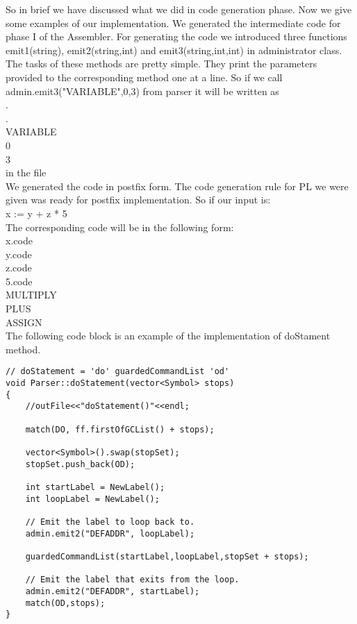 \documentclass[paper=letter, fontsize=12pt]{scrartcl} %
\begin{document}
So in brief we have discussed what we did in code generation phase. Now we give some examples of our implementation. We generated the intermediate code for phase I of the Assembler. For generating the code we introduced three functions emit1(string), emit2(string,int) and emit3(string,int,int) in administrator class. The tasks of these methods are pretty simple. They print the parameters provided to the corresponding method one at a line. So if we call admin.emit3("VARIABLE",0,3) from parser it will be written as\\

.\\
.\\
VARIABLE\\
0\\
3\\
in the file \\

We generated the code in postfix form. The code generation rule for PL we were given was ready for postfix implementation. So if our input is:\\
x := y + z * 5\\
The corresponding code will be in the following form:\\
x.code\\
y.code\\
z.code\\
5.code\\
MULTIPLY\\
PLUS\\
ASSIGN\\

The following code block is an example of the implementation of doStament method.\\
\begin{lstlisting}
// doStatement = 'do' guardedCommandList 'od'
void Parser::doStatement(vector<Symbol> stops)
{
	//outFile<<"doStatement()"<<endl;
	
	match(DO, ff.firstOfGCList() + stops);
	
	vector<Symbol>().swap(stopSet);
	stopSet.push_back(OD);
	
	int startLabel = NewLabel();
	int loopLabel = NewLabel();
	
	// Emit the label to loop back to.
	admin.emit2("DEFADDR", loopLabel);
	
	guardedCommandList(startLabel,loopLabel,stopSet + stops);
	
	// Emit the label that exits from the loop.
	admin.emit2("DEFADDR", startLabel);
	match(OD,stops);
}
\end{lstlisting}
\end{document}
